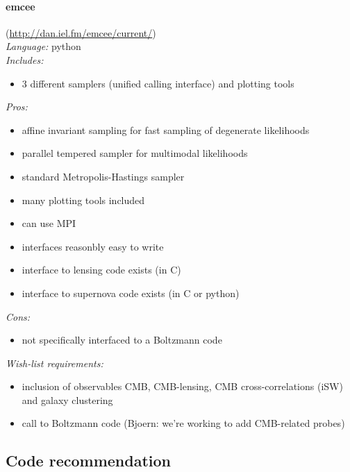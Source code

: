 \paragraph{emcee}(\url{http://dan.iel.fm/emcee/current/})\\
{\it Language:} python\\
{\it Includes:}
\begin{itemize}
 \item 3 different samplers (unified calling interface) and plotting tools
\end{itemize}
{\it Pros:} 
\begin{itemize}
 \item affine invariant sampling for fast sampling of degenerate likelihoods
 \item parallel tempered sampler for multimodal likelihoods
 \item standard Metropolis-Hastings sampler
 \item many plotting tools included
 \item can use MPI
 \item interfaces reasonbly easy to write
 \item interface to lensing code exists (in C)
 \item interface to supernova code exists (in C or python)
 \end{itemize}
{\it Cons:} 
\begin{itemize}
 \item not specifically interfaced to a Boltzmann code
\end{itemize}
{\it Wish-list requirements: }
\begin{itemize}
 \item inclusion of observables CMB, CMB-lensing, CMB cross-correlations (iSW) and galaxy clustering
 \item call to Boltzmann code (Bjoern: we’re working to add CMB-related probes)
\end{itemize}


\subsection{Code recommendation}

